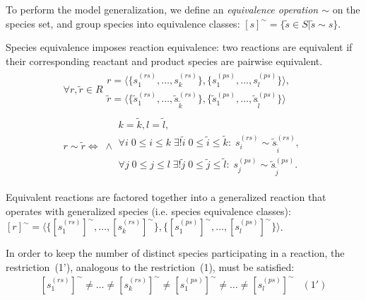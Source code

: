 \documentclass[9pt]{article}
\newcounter{def}
\newcounter{rm}
\begin{document}
To perform the model generalization, we define an \emph{equivalence operation $\sim$} on the species set, and group species into equivalence classes: $[s]^{\sim} = \{\tilde{s} \in S | \tilde{s} \sim s\}$.

Species equivalence imposes reaction equivalence: two reactions are equivalent if their corresponding reactant and product species are pairwise equivalent.
\[ \begin{array}{l}
\mbox{$\forall r, \tilde{r} \in R $} \begin{array}{c}
	\mbox{$r = \langle\{s^{(rs)}_1, \ldots, s^{(rs)}_k\},\{s^{(ps)}_1, \ldots, s^{(ps)}_l\}\rangle,$}\\
	\mbox{$\tilde{r} = \langle\{\tilde{s}^{(rs)}_1, \ldots, \tilde{s}^{(rs)}_{\tilde{k}}\},\{\tilde{s}^{(ps)}_1, \ldots, \tilde{s}^{(ps)}_{\tilde{l}}\}\rangle$}
\end{array}\\ 
\mbox{$r \sim \tilde{r} \iff \; \land$} \begin{array}{l}
	\mbox{$k = \tilde{k}, l = \tilde{l}$}, \\
	\mbox{$\forall i\; 0\leq{i}\leq{k} \; \exists{!} \tilde{i}\; 0\leq \tilde{i}\leq \tilde{k}:\; s^{(rs)}_i \sim \tilde{s}^{(rs)}_{\tilde{i}}$}, \\
	\mbox{$\forall j\;0\leq j\leq l\;\exists{!} \tilde{j}\;0\leq \tilde{j}\leq\tilde{l}:\;s^{(ps)}_j \sim \tilde{s}^{(ps)}_{\tilde{j}}$}.
\end{array}	 
\end{array} \]

Equivalent reactions are factored together into a generalized reaction that operates with generalized species (i.e. species equivalence classes): 
$[r]^{\sim} = \langle\{[s^{(rs)}_1]^{\sim}, \ldots, [s^{(rs)}_k]^{\sim}\}, \{[s^{(ps)}_1]^{\sim}, \ldots, [s^{(ps)}_l]^{\sim}\}\rangle$.

In order to keep the number of distinct species participating in a reaction, the restriction~(1'), analogous to the restriction~(1), must be satisfied:
\[ \begin{array}{lr}
\mbox{$[s^{(rs)}_1]^{\sim} \neq \ldots \neq [s^{(rs)}_k]^{\sim} \neq [s^{(ps)}_1]^{\sim} \neq \ldots \neq [s^{(ps)}_l]^{\sim}$} & (1')
\end{array} \]
\end{document}
